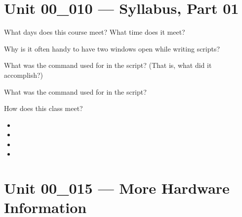 \documentclass[letterpaper,12pt]{exam}
\newcommand{\unit}{Unit 00}
\begin{document}
\begin{questions}

\section*{\unit\_010 --- Syllabus, Part 01} %

\begin{samepage}
	\question What days does this course meet?  What time does it meet?
	\vspace{5mm}
\end{samepage}

\begin{samepage}
	\question 
	\vspace{5mm}
\end{samepage}


\begin{samepage}
\question Why is it often handy to have two windows open while writing scripts? 
\vspace{5mm}
\end{samepage}

\begin{samepage}
\question What was the  command used for in the script? (That is, what did it accomplish?)
\vspace{5mm}
\end{samepage}


\begin{samepage}
\question  What was the  command used for in the script?
\vspace{5mm}
\end{samepage}

\begin{samepage}
	\question How does this class meet?
	  \begin{itemize}
		\item {}
		\vspace{5mm}
		\item {}
		\vspace{5mm}
		\item {}
		\vspace{5mm}
		\item \code{}
		\vspace{5mm}
	   \end{itemize}
\end{samepage}


\section*{\unit\_015 --- More Hardware Information}


\end{questions}
\end{document}
